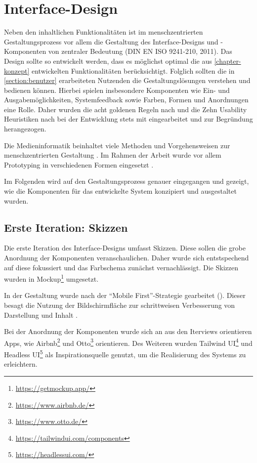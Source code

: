 \chapter{Interface-Design}
\label{chapter-design}
Neben den inhaltlichen Funktionalitäten ist im menschzentrierten Gestaltungsprozess vor allem die
Gestaltung des Interface-Designs und -Komponenten von zentraler Bedeutung (DIN EN ISO 9241-210,
2011). Das Design sollte so entwickelt werden, dass es möglichst optimal die aus
\ref{chapter-konzept} entwickelten Funktionalitäten berücksichtigt. Folglich sollten die in 
\ref*{section:benutzer} erarbeiteten Nutzenden die Gestaltungslösungen verstehen und bedienen können. Hierbei
spielen insbesondere Komponenten wie Ein- und Ausgabemöglichkeiten, Systemfeedback sowie Farben,
Formen und Anordnungen eine Rolle. Daher wurden die acht goldenen Regeln nach
 und die Zehn Usability Heuristiken nach 
bei der Entwicklung stets mit eingearbeitet und zur Begründung herangezogen.

Die Medieninformatik beinhaltet viele Methoden und Vorgehensweisen zur menschzentrierten Gestaltung
. Im Rahmen der Arbeit wurde vor allem Prototyping in verschiedenen Formen
eingesetzt .

Im Folgenden wird auf den Gestaltungsprozess genauer eingegangen und gezeigt, wie die Komponenten für
das entwickelte System konzipiert und ausgestaltet wurden.

\section{Erste Iteration: Skizzen}
Die erste Iteration des Interface-Designs umfasst Skizzen. Diese sollen die grobe Anordnung der
Komponenten veranschaulichen. Daher wurde sich entstspechend auf diese fokussiert und das Farbschema zunächst
vernachlässigt. Die Skizzen wurden in Mockup\footnote{\url{https://getmockup.app/}} umgesetzt. 

In der Gestaltung wurde nach der \enquote{Mobile First}-Strategie gearbeitet (). Dieser
besagt die Nutzung der Bildschirmfläche zur schrittweisen Verbesserung von Darstellung und Inhalt
\cite{kim_chapter_2013}.


Bei der Anordnung der Komponenten wurde sich an aus den Iterviews orientieren Apps, wie
Airbnb\footnote{\url{https://www.airbnb.de/}} und Otto\footnote{\url{https://www.otto.de/}}
orientieren. Des Weiteren wurden Tailwind UI\footnote{\url{https://tailwindui.com/components}} und
Headless UI\footnote{\url{https://headlessui.com/}} als
Inspirationsquelle genutzt, um die Realisierung des Systems zu erleichtern. 

